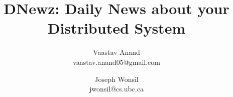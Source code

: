 \documentclass[10pt,twocolumn]{article}
\title{DNewz: Daily News about your Distributed System}
\author{Vaastav Anand \\ vaastav.anand05@gmail.com  \and Joseph Wonsil \\ jwonsil@cs.ubc.ca}
\date{}
\begin{document}
\maketitle



















\balance
{\footnotesize


}
\end{document}
